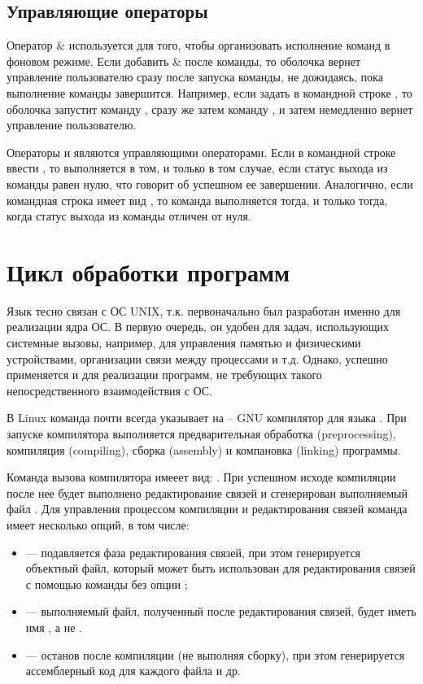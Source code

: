 \subsection{Управляющие операторы}

Оператор \& используется для того, чтобы организовать исполнение команд в фоновом режиме. Если добавить \& после команды, то оболочка вернет управление пользователю сразу после запуска команды, не дожидаясь, пока выполнение команды завершится. Например, если задать в командной строке , то оболочка запустит команду , сразу же затем команду , и затем немедленно вернет управление пользователю.

Операторы \code{||} и \code{\&\&} являются управляющими операторами. Если в командной строке ввести , то  выполняется в том, и только в том случае, если статус выхода из команды  равен нулю, что говорит об успешном ее завершении. Аналогично, если командная строка имеет вид , то команда  выполняется тогда, и только тогда, когда статус выхода из команды  отличен от нуля.

\section{Цикл обработки программ}

Язык  тесно связан с ОС UNIX, т.к. первоначально был разработан именно для реализации ядра ОС. В первую очередь, он удобен для задач, использующих системные вызовы, например, для управления памятью и физическими устройствами, организации связи между процессами и т.д. Однако,  успешно применяется и для реализации программ, не требующих такого непосредственного взаимодействия с ОС.

В Linux команда  почти всегда указывает на  -- GNU компилятор для языка . При запуске компилятора выполняется предварительная обработка (preprocessing), компиляция (compiling), сборка (assembly) и компановка (linking) программы. 

Команда вызова компилятора имееет вид: . При успешном исходе компиляции после нее будет выполнено редактирование связей и сгенерирован выполняемый файл . Для управления процессом компиляции и редактирования связей команда  имеет несколько опций, в том числе: 
\begin{itemize}
	\item {} --- подавляется фаза редактирования связей, при этом генерируется объектный файл, который может быть использован для редактирования связей с помощью команды  без опции ;
	\item {} --- выполняемый файл, полученный после редактирования связей, будет иметь имя , а не . 
	\item {} --- останов после компиляции (не выполняя сборку), при этом генерируется ассемблерный код для каждого файла и др.
\end{itemize}

